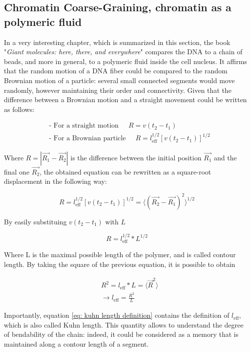 
\subsection{Chromatin Coarse-Graining, chromatin as a polymeric fluid}

In a very interesting chapter, which is summarized in this section, the book "\textit{Giant molecules: here, there, and everywhere}"
\cite{grosbergGiantMoleculesHere2011}
compares the DNA to a chain of beads, and more in general, to a polymeric fluid inside the cell nucleus. It affirms that the random motion of a DNA fiber could be compared to the random Brownian motion of a particle: several small connected segments would move randomly, however maintaining their order and connectivity. Given that the difference between a Brownian motion and a straight movement could be written as follows:

\begin{align*}
    &\text{- For a straight motion } \;\;\;\; R = v(t_2 - t_1) \\ 
    &\text{- For a Brownian particle } \;\;\;\; R = l_{\text{eff}}^{1/2} [v (t_2 - t_1)]^{1/2} 
\end{align*}

Where $R = |\vec{R_1} - \vec{R_2}|$ is the difference between the initial position $\vec{R_1}$ and the final one $\vec{R_2}$, the obtained equation can be rewritten as a square-root displacement in the following way:

$$
    R = l_{\text{eff}}^{1/2} [v (t_2 - t_1)]^{1/2} = \langle(\vec{R_2} - \vec{R_1})^2\rangle^{1/2}
$$

By easily substituing $v (t_2 - t_1)$ with $L$

$$
    R = l_{\text{eff}}^{1/2} * L^{1/2}
$$

Where L is the maximal possible length of the polymer, and is called contour length. By taking the square of the previous equation, it is possible to obtain

\begin{align} \label{eq: kuhn length definition}
    & R^2 = l_{\text{eff}} * L = \langle\vec{R}^2\rangle \nonumber\\ 
    & \rightarrow l_{\text{eff}} = \frac{R^2}{L} 
\end{align}

Importantly, equation \ref{eq: kuhn length definition} contains the definition of $l_{\text{eff}}$, which is also called Kuhn length. This quantity allows to understand the degree of bendability of the chain: indeed, it could be considered as a memory that is maintained along a contour length of a segment. \\


